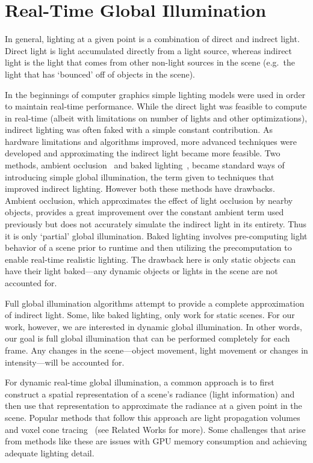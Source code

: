 \section{Real-Time Global Illumination}
In general, lighting at a given point is a combination of direct and indrect light. Direct light is light accumulated directly from a light source, whereas indirect light is the light that comes from other non-light sources in the scene (e.g.\ the light that has `bounced' off of objects in the scene).

In the beginnings of computer graphics simple lighting models were used in order to maintain real-time performance. While the direct light was feasible to compute in real-time (albeit with limitations on number of lights and other optimizations), indirect lighting was often faked with a simple constant contribution. As hardware limitations and algorithms improved, more advanced techniques were developed and approximating the indirect light became more feasible. Two methods, ambient occlusion~\cite{bunnell2005dynamic,moller2008rtr} and baked lighting~\cite{Sloan:2002:PRT:566654.566612,moller2008rtr}, became standard ways of introducing simple global illumination, the term given to techniques that improved indirect lighting. However both these methods have drawbacks. Ambient occlusion, which approximates the effect of light occlusion by nearby objects, provides a great improvement over the constant ambient term used previously but does not accurately simulate the indirect light in its entirety. Thus it is only `partial' global illumination. Baked lighting involves pre-computing light behavior of a scene prior to runtime and then utilizing the precomputation to enable real-time realistic lighting. The drawback here is only static objects can have their light baked---any dynamic objects or lights in the scene are not accounted for.

Full global illumination algorithms attempt to provide a complete approximation of indirect light. Some, like baked lighting, only work for static scenes. For our work, however, we are interested in dynamic global illumination. In other words, our goal is full global illumination that can be performed completely for each frame. Any changes in the scene---object movement, light movement or changes in intensity---will be accounted for.

For dynamic real-time global illumination, a common approach is to first construct a spatial representation of a scene's radiance (light information) and then use that representation to approximate the radiance at a given point in the scene. Popular methods that follow this approach are light propagation volumes~\cite{Kaplanyan:2010:CLP:1730804.1730821} and voxel cone tracing~\cite{crassin2011interactive} (see Related Works for more). Some challenges that arise from methods like these are issues with GPU memory consumption and achieving adequate lighting detail. %

